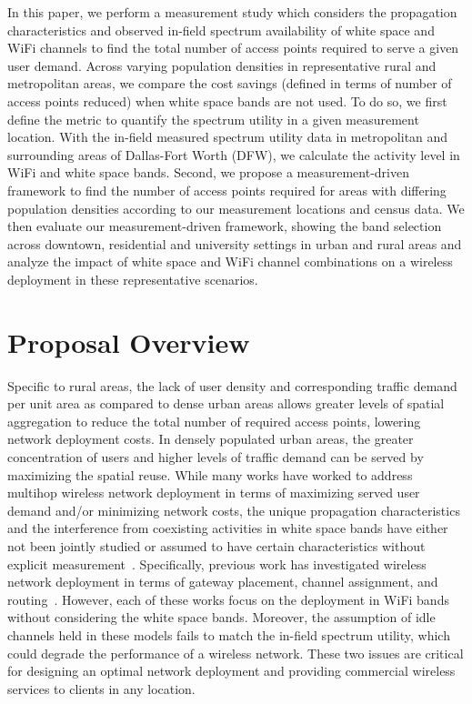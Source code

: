In this paper, we perform a measurement study which considers the propagation 
characteristics and observed in-field spectrum availability of white space
and WiFi channels to find the total number of access points required to serve a 
given user demand. Across varying population densities in representative 
rural and metropolitan areas, we compare the cost savings (defined in terms of
number of access points reduced) when white space bands are not used.
To do so, we first define the metric to quantify the spectrum utility in a
given measurement location. With the in-field measured spectrum utility data 
in metropolitan and surrounding areas of Dallas-Fort Worth (DFW), we 
calculate the activity level in WiFi and white space bands. Second, we 
propose a measurement-driven framework to find the number of access points required 
for areas with differing population densities according to our measurement locations
and census data. We then evaluate our measurement-driven framework, showing
the band selection across downtown, residential and university settings in
urban and rural areas and analyze the impact of white space and WiFi
channel combinations on a wireless deployment in these representative scenarios.



\section{Proposal Overview}




















Specific to rural areas, the lack of user density and corresponding traffic
demand per unit area as compared to dense urban areas allows greater levels of
spatial aggregation to reduce the total number of required access points, lowering
network deployment costs. In densely populated urban areas, the greater concentration
of users and higher levels of traffic demand can be served by maximizing the spatial
reuse. While many works have worked to address multihop wireless network deployment
in terms of maximizing served user demand and/or minimizing network costs,
the unique propagation characteristics and the interference from coexisting
activities in white space bands have either not been jointly studied or assumed to 
have certain characteristics without explicit measurement~\cite{si2010overview}. 
Specifically, previous work has investigated wireless 
network deployment in terms of gateway placement, channel assignment, and 
routing~\cite{he2008optimizing,marina2010topology}.
However, each of these works focus on the deployment in WiFi bands without
considering the white space bands. Moreover, the assumption of idle channels
held in these models fails to match the in-field spectrum utility,
which could degrade the performance of a wireless network. These
two issues are critical for designing an optimal network deployment and
providing commercial wireless services to clients in any location.


